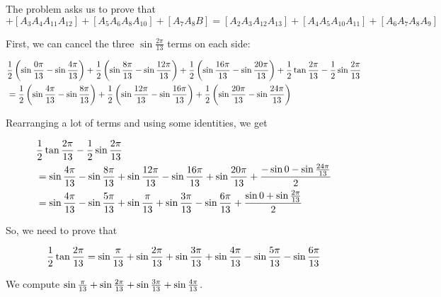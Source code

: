 \documentclass[10pt]{../usamts}
\begin{document}
\begin{solution}
The problem asks us to prove that
\begin{equation}
[A_1A_2A_3] + [A_3A_4A_{11}A_{12}] + [A_5A_6A_{8}A_{10}] + [A_7A_8B] = [A_2A_3A_{12}A_{13}] + [A_4A_5A_{10}A_{11}]+ [A_6A_7A_{8}A_{9}]
\end{equation}

First, we can cancel the three $\sin\frac{2\pi}{13}$ terms on each side:

\newcommand{\showsinsubtraction}[2] {
    \frac{1}{2}\paren{\sinthirteen{#1} - \sinthirteen{#2}}
}

\begin{align*}
    &\showsinsubtraction{0}{4} +
    \showsinsubtraction{8}{12} +
    \showsinsubtraction{16}{20} +
    \showtrianglebarea \\
    &=
    \showsinsubtraction{4}{8} +
    \showsinsubtraction{12}{16} +
    \showsinsubtraction{20}{24}
\end{align*}

Rearranging a lot of terms and using some identities, we get

\begin{align*}
    &\frac{1}{2} \tan{\frac{2\pi}{13}} - \frac{1}{2} \sin{\frac{2\pi}{13}} \\
    &= \sin{{\frac{4\pi}{13}}} - \sin{{\frac{8\pi}{13}}} + \sin{{\frac{12\pi}{13}}} - \sin{{\frac{16\pi}{13}}}
    + \sin{{\frac{20\pi}{13}}} + \frac{-\sin0 - \sin{{\frac{24\pi}{13}}}}{2} \\
    &= \sin{{\frac{4\pi}{13}}} - \sin{{\frac{5\pi}{13}}} + \sin{{\frac{\pi}{13}}} + \sin{{\frac{3\pi}{13}}}
    - \sin{{\frac{6\pi}{13}}} + \frac{\sin0 + \sin{{\frac{2\pi}{13}}}}{2}
\end{align*}

So, we need to prove that

\begin{equation}
    \frac{1}{2} \tan{{\frac{2\pi}{13}}}
    = \sin{{\frac{\pi}{13}}} + \sin{{\frac{2\pi}{13}}} + \sin{{\frac{3\pi}{13}}} + \sin{{\frac{4\pi}{13}}} - \sin{{\frac{5\pi}{13}}} - \sin{{\frac{6\pi}{13}}}
    \label{eq:p5intermediate}
\end{equation}

We compute $\sin{{\frac{\pi}{13}}} + \sin{{\frac{2\pi}{13}}} + \sin{{\frac{3\pi}{13}}} + \sin{{\frac{4\pi}{13}}}$.


\end{solution}
\end{document}
